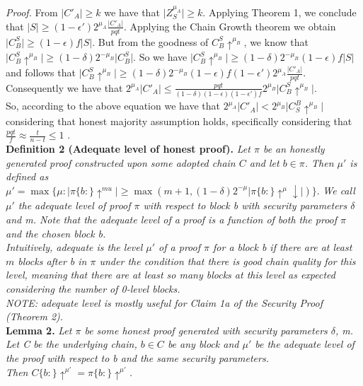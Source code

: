 \textit{Proof.} From $\vert C'_A \vert \geq k$ we have that $\vert Z^{\mu_A}_S
\vert \geq k$. Applying Theorem 1, we conclude that $\vert S \vert \geq
(1-\epsilon')2^{\mu_A} \frac{\vert C'_A \vert}{pqt}$. Applying the Chain Growth
theorem \cite{Backbone} we obtain $\vert C_{B}^S \vert \geq (1 - \epsilon)f
\vert S \vert$. But from the goodness of $C_{B}^S \uparrow^{\mu_B}$, we know
that $\vert C_{B}^S\uparrow^{\mu_B} \vert \geq (1 - \delta)2^{-\mu_B} \vert
C_{B}^S \vert $. So we have $\vert C_{B}^S\uparrow^{\mu_B} \vert \geq
(1 - \delta)2^{-\mu_B} (1 - \epsilon)f \vert S \vert $ and follows that
$\vert C_{B}^S\uparrow^{\mu_B} \vert \geq (1 - \delta)2^{-\mu_B} (1 - \epsilon)f
(1-\epsilon')2^{\mu_A} \frac{\vert C'_A \vert}{pqt} $. Consequently we have that
$2^{\mu_A} \vert C'_A \vert \leq \frac{pqt}{(1- \delta)(1-\epsilon)(1-\epsilon')f}
2^{\mu_B} \vert C_{B}^S\uparrow^{\mu_B} \vert $.   \\

So, according to the above equation we have that $2^{\mu_A} \vert C'_A \vert
<  2^{\mu_B} \vert    C^{B}_{S}\uparrow^{\mu_B}\vert $ considering that honest
majority assumption holds, specifically considering that $ \frac{pqt}{f} \approx
\frac{t}{n-t} \leq 1 $ .\\

\textbf{Definition 2 (Adequate level of honest proof).} \textit{Let $\pi$ be an
honestly generated proof constructed upon some adopted chain $C$ and let $b \in 
\pi $. Then $\mu'$ is defined as $\mu' = \max \{ \mu: \vert \pi\{b:\}\uparrow^{mu}
\vert \geq \max( m+1, (1-\delta)2^{-\mu} \vert \pi\{b:\}\uparrow^{\mu}\downarrow \vert )\}$}.
\textit{We call $\mu'$ the adequate level of proof $\pi$ with respect to block b with
security parameters $\delta$ and m. Note that the adequate level of a proof is a
function of both the proof $\pi$ and the chosen block b.}\\

\textit{Intuitively, adequate is the level $\mu'$ of a proof $\pi$ for a block b
if there are at least $m$ blocks after b in $\pi$ under the condition that there
is good chain quality for this level, meaning that there are at least so many blocks
at this level as expected considering the number of 0-level blocks.\\
NOTE: adequate level is mostly useful for Claim 1a of the Security Proof (Theorem 2).}\\

\textbf{Lemma 2.} \textit{Let $\pi$ be some honest proof generated with security
parameters $\delta$, m. Let C be the underlying chain, $b \in C$ be any block
and $\mu'$ be the adequate level of the proof with respect to b and the same
security parameters.\\Then $C\{b:\}\uparrow^{\mu'} = \pi\{b:\}\uparrow^{\mu'}$.}\\


